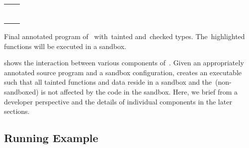 \begin{listing}[t!]
  \begin{tabular}{c c}
    \begin{minipage}[b]{.22\textwidth}
\inputminted[mathescape, escapeinside=||, fontsize=\tiny{}]{c}{examples/conv1.c}
    \end{minipage} &
    \begin{minipage}[b]{.22\textwidth}
\inputminted[mathescape, highlightlines={1-19}, highlightcolor=taintcolor, escapeinside=||, fontsize=\tiny{}]{c}{examples/conv2.c}
    \end{minipage} %
  \end{tabular}
\caption{Final annotated program of~ with~\textcolor{taintcolor}{tainted} and~\textcolor{checkcolor}{checked} types. The~\colorbox{taintcolor}{highlighted} functions will be executed in a sandbox.}
\label{lst:final}
\end{listing}



 shows the interaction between various components of~\systemname{}.
Given an appropriately annotated source program and a sandbox configuration, \systemname{} creates an executable such that all tainted functions and data reside in a sandbox and the~\cregion (non-sandboxed) is not affected by the code in the sandbox.
Here, we brief \systemname{} from a developer perspective and the details of individual components in the later sections.


\subsection{Running Example}
\label{subsec:identifyregionstosbx}

